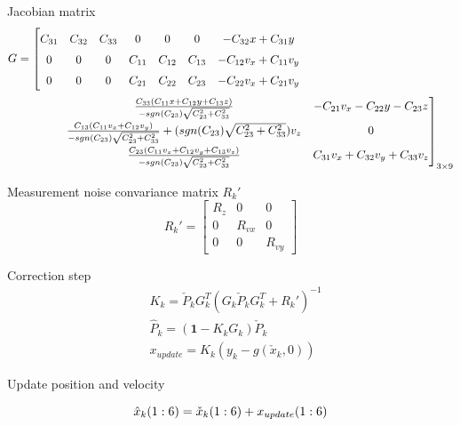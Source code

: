 \documentclass{cisXXX} %
\begin{document}
Jacobian matrix
\begin{equation}
\begin{aligned}
\renewcommand\arraystretch{1.5} 
G&= \left[\begin{matrix}
C_{31}   & C_{32}   & C_{33} &0  &0 &0  &-C_{32}x+C_{31}y       \\
0  &0  &0  &C_{11}   &C_{12}  &C_{13}  & -C_{12}v_x+C_{11}v_y   \\
0  &0  &0  & C_{21}  & C_{22}  & C_{23}  &-C_{22}v_x + C_{21}v_y
\end{matrix}\right. \\
&\qquad\qquad
\left.\begin{matrix} \frac{C_{33}(C_{11}x+C_{12}y+C_{13}z)}{-sgn(C_{23})\sqrt{C_{23}^2+C_{33}^2}}   & -C_{21}v_x-C_{22}y-C_{23}z   \\
 \frac{C_{13}(C_{11}v_x+C_{12}v_y)}{-sgn(C_{23})\sqrt{C_{23}^2+C_{33}^2}} + (sgn(C_{23})\sqrt{C_{23}^2+C_{33}^2})v_z  &0   \\
   \frac{C_{23}(C_{11}v_x+C_{12}v_y+C_{13}v_z)}{-sgn(C_{23})\sqrt{C_{23}^2+C_{33}^2}}   &C_{31}v_x+C_{32}v_y+C_{33}v_z
\end{matrix}\right]_{3\times 9}
\end{aligned}
\end{equation}

Measurement noise convariance matrix $R_k'$
\begin{equation}
R_k'=\begin{bmatrix}
R_{z}  & 0   & 0 \\
0  & R_{vx}   & 0 \\
0  & 0   & R_{vy} 
\end{bmatrix}
\end{equation}

Correction step
\begin{equation}
\begin{split}
&K_k = \check{P}_k G_k^T\left(G_k\check{P}_k G_k^T + R_k'\right)^{-1}   \\
&\hat{P}_k  = (\bm{1}-K_k G_k)\check{P}_k  \\
&x_{update} = K_k(y_k-g(\check{x}_k,0)) 
\end{split}
\end{equation}

Update position and velocity

\begin{equation}
\hat{x}_k\small{(1:6)} = \check{x}_k\small{(1:6)}+x_{update}\small{(1:6)}
\end{equation}
\end{document}
